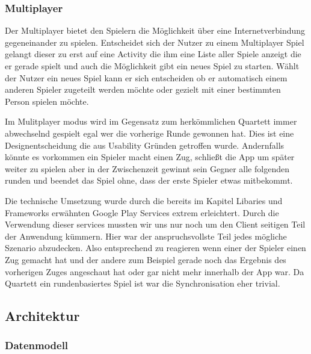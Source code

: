 \documentclass{scrartcl}
\begin{document}
\subsubsection{Multiplayer}
Der Multiplayer bietet den Spielern die Möglichkeit über eine Internetverbindung gegeneinander zu spielen. Entscheidet sich der Nutzer zu einem Multiplayer Spiel gelangt dieser zu erst auf eine Activity die ihm eine Liste aller Spiele anzeigt die er gerade spielt und auch die Möglichkeit gibt ein neues Spiel zu starten. Wählt der Nutzer ein neues Spiel kann er sich entscheiden ob er automatisch einem anderen Spieler zugeteilt werden möchte oder gezielt mit einer bestimmten Person spielen möchte.

Im Mulitplayer modus wird im Gegensatz zum herkömmlichen Quartett immer abwechselnd gespielt egal wer die vorherige Runde gewonnen hat. Dies ist eine Designentscheidung die aus Usability Gründen getroffen wurde. Andernfalls könnte es vorkommen ein Spieler macht einen Zug, schließt die App um später weiter zu spielen aber in der Zwischenzeit gewinnt sein Gegner alle folgenden runden und beendet das Spiel ohne, dass der erste Spieler etwas mitbekommt.

Die technische Umsetzung wurde durch die bereits im Kapitel Libaries und Frameworks erwähnten Google Play Services extrem erleichtert. Durch die Verwendung dieser services mussten wir uns nur noch um den Client seitigen Teil der Anwendung kümmern. Hier war der anspruchsvollste Teil jedes mögliche Szenario abzudecken. Also entsprechend zu reagieren wenn einer der Spieler einen Zug gemacht hat und der andere zum Beispiel gerade noch das Ergebnis des vorherigen Zuges angeschaut hat oder gar nicht mehr innerhalb der App war. Da Quartett ein rundenbasiertes Spiel ist war die Synchronisation eher trivial.    
\subsection{Architektur}
\subsubsection{Datenmodell}
\end{document}
